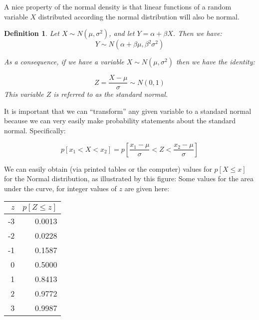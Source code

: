 \documentclass[12pt]{extbook}
\newtheorem{df}{Definition}[section]
\begin{document}





A nice property of the normal density is that linear functions of a random variable $X$ distributed according the normal distribution will also be normal.

\begin{df}
Let $X \sim N(\mu, \sigma^2)$, and let $Y=\alpha + \beta X$.   Then we have:
\begin{displaymath}
Y \sim N(\alpha + \beta \mu, \beta^2\sigma^2)
\end{displaymath}

As a consequence, if we have a variable $X \sim N(\mu, \sigma^2)$ then we have the identity:

\begin{displaymath}
Z = \frac{X-\mu}{\sigma} \sim N(0,1)
\end{displaymath}
This variable $Z$ is referred to as the \emph{standard normal}.
\end{df}

It is important that we can ``transform'' any given variable to a standard normal because we can very easily make probability statements about the standard normal.   Specifically:

\begin{displaymath}
p[x_1 < X < x_2] = p \left[ \frac{x_1-\mu}{\sigma} < Z < \frac{x_2 -\mu}{\sigma} \right]
\end{displaymath}

We can easily obtain (via printed tables or the computer) values for $p[X \leq x]$ for the Normal distribution, as illustrated by this figure:
Some values for the area under the curve, for integer values of $z$ are given here:

\begin{center}
\begin{tabular}{rr}
  \hline
  $z$ & $p[Z \leq z]$ \\ 
  \hline
 -3 & 0.0013 \\ 
 -2 & 0.0228 \\ 
 -1 & 0.1587 \\ 
  0 & 0.5000 \\ 
  1 & 0.8413 \\ 
  2 & 0.9772 \\ 
  3 & 0.9987 \\ 
   \hline
\end{tabular}
\end{center}
\end{document}
